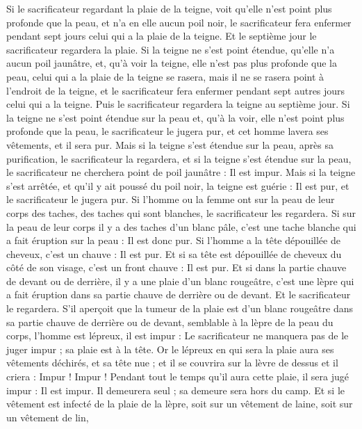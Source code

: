 \begin{multicols}{2}
Si le sacrificateur regardant la plaie de la teigne, voit qu'elle n'est point plus profonde que la peau, et n'a en elle aucun poil noir, le sacrificateur fera enfermer pendant sept jours celui qui a la plaie de la teigne.
Et le septième jour le sacrificateur regardera la plaie. Si la teigne ne s'est point étendue, qu'elle n'a aucun poil jaunâtre, et, qu'à voir la teigne, elle n'est pas plus profonde que la peau,
celui qui a la plaie de la teigne se rasera, mais il ne se rasera point à l'endroit de la teigne, et le sacrificateur fera enfermer pendant sept autres jours celui qui a la teigne.
Puis le sacrificateur regardera la teigne au septième jour. Si la teigne ne s'est point étendue sur la peau et, qu'à la voir, elle n'est point plus profonde que la peau, le sacrificateur le jugera pur, et cet homme lavera ses vêtements, et il sera pur.
Mais si la teigne s'est étendue sur la peau, après sa purification, le sacrificateur la regardera,
et si la teigne s'est étendue sur la peau, le sacrificateur ne cherchera point de poil jaunâtre : Il est impur.
Mais si la teigne s'est arrêtée, et qu'il y ait poussé du poil noir, la teigne est guérie : Il est pur, et le sacrificateur le jugera pur.
Si l'homme ou la femme ont sur la peau de leur corps des taches, des taches qui sont blanches,
le sacrificateur les regardera. Si sur la peau de leur corps il y a des taches d'un blanc pâle, c'est une tache blanche qui a fait éruption sur la peau : Il est donc pur.
Si l'homme a la tête dépouillée de cheveux, c'est un chauve : Il est pur.
Et si sa tête est dépouillée de cheveux du côté de son visage, c'est un front chauve : Il est pur.
Et si dans la partie chauve de devant ou de derrière, il y a une plaie d'un blanc rougeâtre, c'est une lèpre qui a fait éruption dans sa partie chauve de derrière ou de devant.
Et le sacrificateur le regardera. S'il aperçoit que la tumeur de la plaie est d'un blanc rougeâtre dans sa partie chauve de derrière ou de devant, semblable à la lèpre de la peau du corps,
l'homme est lépreux, il est impur : Le sacrificateur ne manquera pas de le juger impur ; sa plaie est à la tête.
Or le lépreux en qui sera la plaie aura ses vêtements déchirés, et sa tête nue ; et il se couvrira sur la lèvre de dessus et il criera : Impur ! Impur !
Pendant tout le temps qu'il aura cette plaie, il sera jugé impur : Il est impur. Il demeurera seul ; sa demeure sera hors du camp.
Et si le vêtement est infecté de la plaie de la lèpre, soit sur un vêtement de laine, soit sur un vêtement de lin,

\end{multicols}
